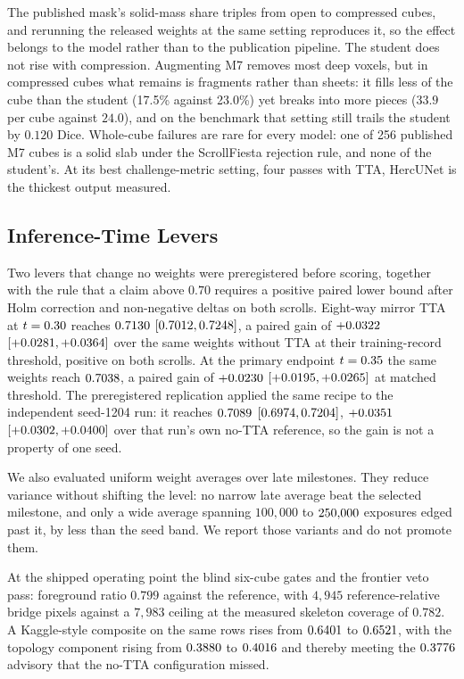 The published mask's solid-mass share triples from open to compressed cubes,
and rerunning the released weights at the same setting reproduces it, so the
effect belongs to the model rather than to the publication pipeline. The
student does not rise with compression. Augmenting M7 removes most deep voxels,
but in compressed cubes what remains is fragments rather than sheets: it fills
less of the cube than the student (17.5\% against 23.0\%) yet breaks into more
pieces ($33.9$ per cube against $24.0$), and on the benchmark that setting still
trails the student by $0.120$ Dice. Whole-cube failures are rare for every model: one of
256 published M7 cubes is a solid slab under the ScrollFiesta rejection rule,
and none of the student's. At its best challenge-metric setting, four passes
with TTA, HercUNet is the thickest output measured.

\subsection{Inference-Time Levers}

Two levers that change no weights were preregistered before scoring, together
with the rule that a claim above $0.70$ requires a positive paired lower bound
after Holm correction and non-negative deltas on both scrolls.
Eight-way mirror TTA at $t=0.30$ reaches $0.7130$
$[0.7012,0.7248]$, a paired gain of $+0.0322$
$[+0.0281,+0.0364]$ over the same weights without TTA at
their training-record threshold, positive on both scrolls.
At the primary endpoint $t=0.35$ the same weights reach $0.7038$,
a paired gain of $+0.0230$ $[+0.0195,+0.0265]$ at matched
threshold.
The preregistered replication applied the same recipe to the independent
seed-1204 run: it reaches $0.7089$ $[0.6974,0.7204]$,
$+0.0351$ $[+0.0302,+0.0400]$ over that run's own
no-TTA reference, so the gain is not a property of one seed.

We also evaluated uniform weight averages over late milestones.
They reduce variance without shifting the level: no narrow late average beat the
selected milestone, and only a wide average spanning $100{,}000$ to
$250{,}000$ exposures edged past it, by less than the seed band.
We report those variants and do not promote them.

At the shipped operating point the blind six-cube gates and the frontier veto
pass: foreground ratio $0.799$ against the reference, with $4{,}945$
reference-relative bridge pixels against a $7{,}983$ ceiling at the measured
skeleton coverage of $0.782$.
A Kaggle-style composite on the same rows rises from $0.6401$ to
$0.6521$, with the topology component rising from $0.3880$ to
$0.4016$ and thereby meeting the $0.3776$ advisory that the
no-TTA configuration missed.

